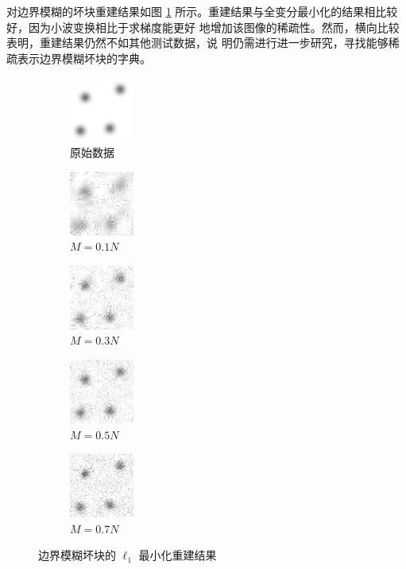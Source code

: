 对边界模糊的坏块重建结果如图 \ref{fig:L12dsmooth}
所示。重建结果与全变分最小化的结果相比较好，因为小波变换相比于求梯度能更好
地增加该图像的稀疏性。然而，横向比较表明，重建结果仍然不如其他测试数据，说
明仍需进行进一步研究，寻找能够稀疏表示边界模糊坏块的字典。

\begin{figure}
\centering
\begin{subfigure}[t]{1.1in}
	\includegraphics{Figure/testdata/2dsmooth.png}
	\caption{原始数据}
\end{subfigure}
\begin{subfigure}[t]{1.1in}
	\includegraphics{Figure/L1/2dsmooth10.png}
	\caption{$M = 0.1 N$}
\end{subfigure}
\begin{subfigure}[t]{1.1in}
	\includegraphics{Figure/L1/2dsmooth30.png}
	\caption{$M = 0.3 N$}
\end{subfigure}
\begin{subfigure}[t]{1.1in}
	\includegraphics{Figure/L1/2dsmooth50.png}
	\caption{$M = 0.5 N$}
\end{subfigure}
\begin{subfigure}[t]{1.1in}
	\includegraphics{Figure/L1/2dsmooth70.png}
	\caption{$M = 0.7 N$}
\end{subfigure}
\caption{边界模糊坏块的 $\ell_1$ 最小化重建结果}
\label{fig:L12dsmooth}
\end{figure}

